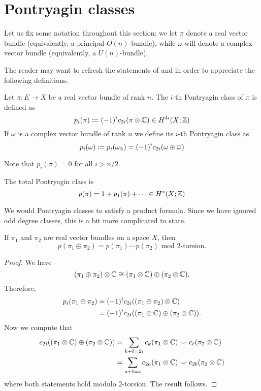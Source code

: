 \documentclass[ma3408.tex]{subfiles}
\begin{document}
\section{Pontryagin classes}
\begin{Not}
Let us fix some notation throughout this section: we let $\pi$ denote a real vector bundle (equivalently, a principal $O(n)$-bundle), while $\omega$ will denote a complex vector bundle (equivalently, a $U(n)$-bundle). 
\end{Not}
The reader may want to refresh the statements of  and  in order to appreciate the following definitions. 
\begin{Def}
Let $\pi \colon E \to X$ be a real vector bundle of rank $n$. The $i$-th Pontryagin class of $\pi$ is defined as
\[
p_i(\pi) \coloneqq (-1)^ic_{2i}(\pi \otimes \mathbb{C}) \in H^{4i}(X;\mathbb{Z})
\]
If $\omega$ is a complex vector bundle of rank $n$ we define its $i$-th Pontryagin class as 
\[
p_i(\omega) \coloneqq p_i(\omega_{\mathbb{R}}) = (-1)^ic_{2i}(\omega \oplus \overline{\omega})
\]
\end{Def}
\begin{Rem}
Note that $p_i(\pi) = 0$ for all $i > n/2$. 
\end{Rem}
\begin{Def}
The total Pontryagin class is
\[
p(\pi) = 1 + p_1(\pi) + \cdots \in H^*(X;\mathbb{Z})
\]
\end{Def}
\begin{Rem}
We would Pontryagin classes to satisfy a product formula. Since we have ignored odd degree classes, this is a bit more complicated to state. 
\end{Rem}
\begin{Thm}\label{thm:whitney-sum-pont}
If $\pi_1$ and $\pi_2$ are real vector bundles on a space $X$, then
\[
p(\pi_1 \oplus \pi_2) = p(\pi_1) \smile p(\pi_2) \text{ mod $2$-torsion}.
\]
\end{Thm}
\begin{proof}
We have 
\[
(\pi_1 \oplus \pi_2) \otimes \mathbb{C} \cong (\pi_1 \otimes \mathbb{C}) \oplus (\pi_2 \otimes \mathbb{C}).
\]
Therefore,
\begin{align*}
    p_i(\pi_1 \oplus \pi_2) & = (-1)^i c_{2i}((\pi_1 \oplus \pi_2) \otimes \mathbb{C}) \\
    & = (-1)^{i}c_{2i}((\pi_1 \otimes \mathbb{C}) \oplus (\pi_2 \otimes \mathbb{C})).
\end{align*}
Now we compute that 
\[
\begin{split}
c_{2i}((\pi_1 \otimes \mathbb{C}) \oplus (\pi_2 \otimes \mathbb{C})) &= \sum_{k+ \ell = 2i} c_k(\pi_1 \otimes \mathbb{C}) \smile c_{\ell}(\pi_2 \otimes \mathbb{C}) \\
&= \sum_{a + b = i} c_{2a}(\pi_1 \otimes \mathbb{C}) \smile c_{2b}(\pi_2 \otimes \mathbb{C})
\end{split}
\]
where both statements hold modulo 2-torsion. The result follows. 
\end{proof}
\end{document}
